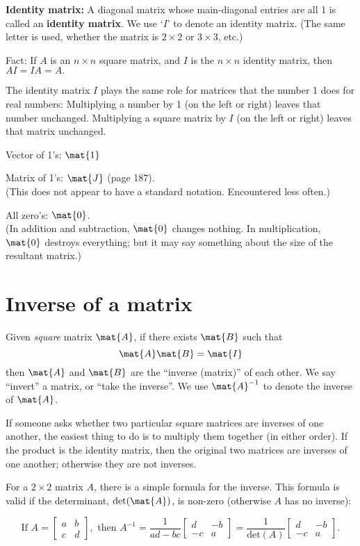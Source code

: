 \documentclass[12pt]{article}
\begin{document}
{\bf{Identity matrix:}}
A diagonal matrix whose main-diagonal entries are all 1 is called an {\bf{identity matrix}}.
We use `$I$' to denote an identity matrix.  (The same letter is used, whether the
matrix is $2\times 2$ or $3 \times 3$, etc.)

Fact: If $A$ is an $n \times n$ square matrix, and $I$ is the $n \times n$ identity
matrix, then $AI = IA = A.$

The identity matrix $I$ plays the same role for matrices that the number 1 does for
real numbers: Multiplying a number by 1 (on the left or right) leaves that number
unchanged.  Multiplying a square matrix by $I$ (on the left or right) leaves that
matrix unchanged.

Vector of 1's: $\mat{1}$

Matrix of 1's: $\mat{J}$ (page 187).\\
(This does not appear to have a standard notation.
Encountered less often.)

All zero's: $\mat{0}$.\\
(In addition and subtraction, $\mat{0}$ changes nothing.
In multiplication, $\mat{0}$ destroys everything;
but it may say something about the size of the resultant matrix.)


\section{Inverse of a matrix}

Given \emph{square} matrix $\mat{A}$,
if there exists $\mat{B}$ such that
\[
\mat{A}\mat{B} = \mat{I}
\]
then $\mat{A}$ and $\mat{B}$ are the ``inverse (matrix)'' of each
other.
We say ``invert'' a matrix, or ``take the inverse''.
We use $\mat{A}^{-1}$ to denote the inverse of $\mat{A}$.

If someone asks whether two particular square matrices are inverses of one another,
the easiest thing to do is to multiply them together (in either order).
If the product is the identity matrix, then the original two matrices are
inverses of one another; otherwise they are not inverses.

For a $2 \times 2$ matrix $A$, there is a simple formula for the inverse.
This formula is valid if the determinant,
$\operatorname{det}(\mat{A})$,
is non-zero (otherwise $A$ has no inverse):

\[ {\mbox{If }} 
A =  \left[ \begin{array}{cc}  a & b \\ c & d  \end{array} \right],
{\mbox{ then }}
A^{-1} = \frac{1}{ad-bc}
 \left[ \begin{array}{cc}  d & -b \\ -c & a  \end{array} \right]
 = \frac{1}{{\mbox{det}}(A)}
 \left[ \begin{array}{cc}  d & -b \\ -c & a  \end{array} \right].\]
\end{document}
